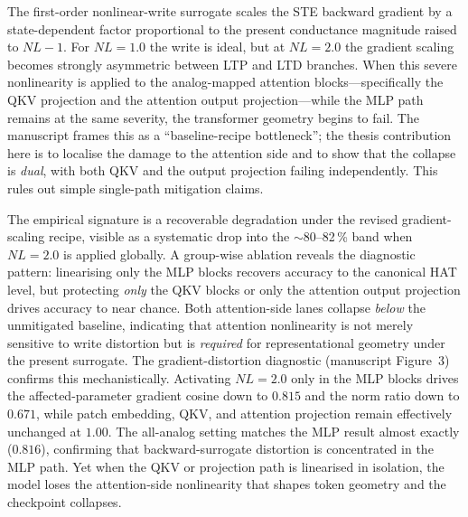 The first-order nonlinear-write surrogate scales the STE backward gradient by a state-dependent factor proportional to the present conductance magnitude raised to $NL-1$.  For $NL=1.0$ the write is ideal, but at $NL=2.0$ the gradient scaling becomes strongly asymmetric between LTP and LTD branches.  When this severe nonlinearity is applied to the analog-mapped attention blocks---specifically the QKV projection and the attention output projection---while the MLP path remains at the same severity, the transformer geometry begins to fail.  The manuscript frames this as a ``baseline-recipe bottleneck''; the thesis contribution here is to localise the damage to the attention side and to show that the collapse is \emph{dual}, with both QKV and the output projection failing independently.  This rules out simple single-path mitigation claims.

The empirical signature is a recoverable degradation under the revised gradient-scaling recipe, visible as a systematic drop into the $\sim$80--82\,\% band when $NL=2.0$ is applied globally.  A group-wise ablation reveals the diagnostic pattern: linearising only the MLP blocks recovers accuracy to the canonical HAT level, but protecting \emph{only} the QKV blocks or only the attention output projection drives accuracy to near chance.  Both attention-side lanes collapse \emph{below} the unmitigated baseline, indicating that attention nonlinearity is not merely sensitive to write distortion but is \emph{required} for representational geometry under the present surrogate.  The gradient-distortion diagnostic (manuscript Figure~3) confirms this mechanistically.  Activating $NL=2.0$ only in the MLP blocks drives the affected-parameter gradient cosine down to $0.815$ and the norm ratio down to $0.671$, while patch embedding, QKV, and attention projection remain effectively unchanged at $1.00$.  The all-analog setting matches the MLP result almost exactly ($0.816$), confirming that backward-surrogate distortion is concentrated in the MLP path.  Yet when the QKV or projection path is linearised in isolation, the model loses the attention-side nonlinearity that shapes token geometry and the checkpoint collapses.

